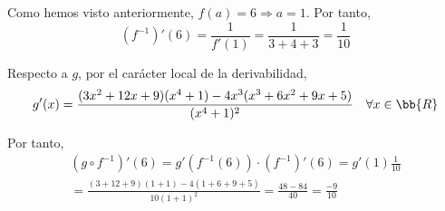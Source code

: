 \begin{ejercicio}
\begin{enumerate}
        Como hemos visto anteriormente, $f(a)=6 \Longrightarrow a=1$. Por tanto,
        \begin{equation*}
            (f^{-1})'(6) = \frac{1}{f'(1)} = \frac{1}{3+4+3} = \frac{1}{10}
        \end{equation*}

        Respecto a $g$, por el carácter local de la derivabilidad,
        $$g'(x)=\frac{(3x^2+12x+9)(x^4+1)-4x^3(x^3+6x^2+9x+5)}{(x^4+1)^2} \quad \forall x \in \bb{R}$$

        Por tanto,
        \begin{multline*}
            (g\circ f^{-1})'(6) = g'(f^{-1}(6)) \cdot (f^{-1})'(6) =  g'(1) \frac{1}{10}\\
            = \frac{(3+12+9)(1+1)-4(1+6+9+5)}{10(1+1)^2} =\frac{48-84}{40} = \frac{-9}{10}
        \end{multline*}
        
    \end{enumerate}
\end{ejercicio}


